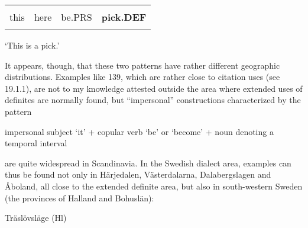 \begin{tabular}{llll}
\lsptoprule
\multicolumn{4}{l}{De

}\\
this & here & be.PRS & {\bfseries pick.DEF}\\
\lspbottomrule
\end{tabular}

\begin{styleTranslation}
‘This is a pick.’

\end{styleTranslation}

\begin{styleBodyTextFirst}
It appears, though, that these two patterns have rather different geographic distributions. Examples like 139, which are rather close to citation uses (see 19.1.1), are not to my knowledge attested outside the area where extended uses of definites are normally found, but “impersonal” constructions characterized by the pattern

\end{styleBodyTextFirst}

\begin{styleBlockQuote}
impersonal subject ‘it’ + copular verb ‘be’ or ‘become’ + noun denoting a temporal interval

\end{styleBlockQuote}

\begin{styleBodyTextFirst}
are quite widespread in Scandinavia. In the Swedish dialect area, examples can thus be found not only in Härjedalen, Västerdalarna, Dalabergslagen and Åboland, all close to the extended definite area, but also in south-western Sweden (the provinces of Halland and Bohuslän): 

\end{styleBodyTextFirst}

\begin{listWWNumileveli}
\item {}

\begin{styleExample}
Träslövsläge (Hl)

\end{styleExample}

\end{listWWNumileveli}

